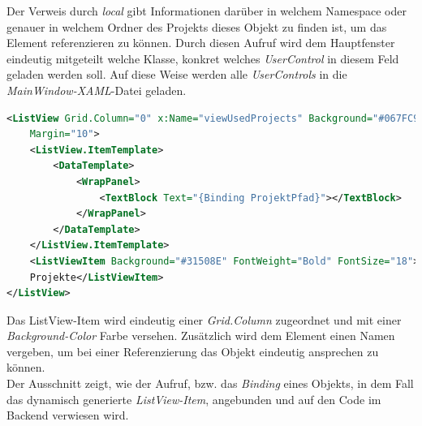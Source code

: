 Der Verweis durch \textit{local} gibt Informationen darüber in welchem Namespace oder genauer in welchem Ordner des Projekts dieses Objekt zu finden ist, um das Element 
referenzieren zu können. Durch diesen Aufruf wird dem Hauptfenster eindeutig mitgeteilt welche Klasse, konkret welches \textit{UserControl} in diesem Feld 
geladen werden soll.
Auf diese Weise werden alle \textit{UserControls} in die \textit{MainWindow-XAML}-Datei geladen.

\begin{lstlisting}[language=XML,
    frame=single,           % Ein Rahmen um den Code
    framexleftmargin=15pt,  % Rahmen link von den Zahlen
    style=algoBericht,
    label={startmenuview},
    captionpos=b,           % Caption unter den Code setzen
caption={Startmenu-Recent-Projects-Code}]
<ListView Grid.Column="0" x:Name="viewUsedProjects" Background="#067FC9" 
    Margin="10">
    <ListView.ItemTemplate>
        <DataTemplate>
            <WrapPanel>
                <TextBlock Text="{Binding ProjektPfad}"></TextBlock>
            </WrapPanel>
        </DataTemplate>
    </ListView.ItemTemplate>
    <ListViewItem Background="#31508E" FontWeight="Bold" FontSize="18">
    Projekte</ListViewItem>
</ListView>
\end{lstlisting}
Das ListView-Item wird eindeutig einer \textit{Grid.Column} zugeordnet und mit einer \textit{Background-Color} Farbe versehen. 
Zusätzlich wird dem Element
einen Namen vergeben, um bei einer Referenzierung das Objekt eindeutig ansprechen zu können.
\\Der Ausschnitt zeigt, wie der Aufruf, bzw. das \textit{Binding} eines Objekts, in dem Fall das dynamisch generierte \textit{ListView-Item}, 
angebunden und auf den Code im Backend verwiesen wird. 
\pagebreak
